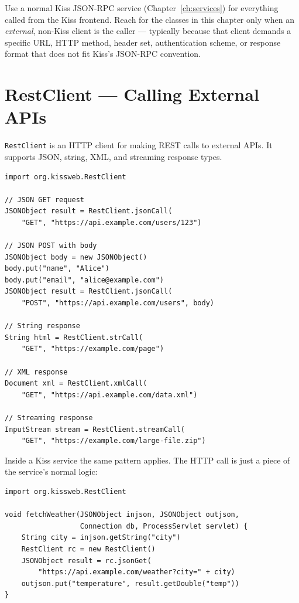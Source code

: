 \begin{notebox}
Use a normal Kiss JSON-RPC service (Chapter~\ref{ch:services}) for everything called from the Kiss frontend.  Reach for the classes in this chapter only when an \emph{external}, non-Kiss client is the caller --- typically because that client demands a specific URL, HTTP method, header set, authentication scheme, or response format that does not fit Kiss's JSON-RPC convention.
\end{notebox}

\section{RestClient --- Calling External APIs}
\label{sec:ext-restclient}

\texttt{RestClient} is an HTTP client for making REST calls to external APIs.  It supports JSON, string, XML, and streaming response types.

\begin{lstlisting}[style=groovy]
import org.kissweb.RestClient

// JSON GET request
JSONObject result = RestClient.jsonCall(
    "GET", "https://api.example.com/users/123")

// JSON POST with body
JSONObject body = new JSONObject()
body.put("name", "Alice")
body.put("email", "alice@example.com")
JSONObject result = RestClient.jsonCall(
    "POST", "https://api.example.com/users", body)

// String response
String html = RestClient.strCall(
    "GET", "https://example.com/page")

// XML response
Document xml = RestClient.xmlCall(
    "GET", "https://api.example.com/data.xml")

// Streaming response
InputStream stream = RestClient.streamCall(
    "GET", "https://example.com/large-file.zip")
\end{lstlisting}

\noindent
Inside a Kiss service the same pattern applies.  The HTTP call is just a piece of the service's normal logic:

\begin{lstlisting}[style=groovy]
import org.kissweb.RestClient

void fetchWeather(JSONObject injson, JSONObject outjson,
                  Connection db, ProcessServlet servlet) {
    String city = injson.getString("city")
    RestClient rc = new RestClient()
    JSONObject result = rc.jsonGet(
        "https://api.example.com/weather?city=" + city)
    outjson.put("temperature", result.getDouble("temp"))
}
\end{lstlisting}

